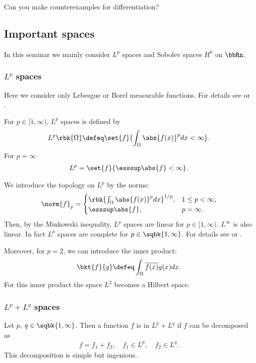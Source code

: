 \documentclass[openany, a4paper, oneside]{jsbook}
\begin{document}
Can you make counterexamples for differentiation?
\subsection{Important spaces}

In this seminar we mainly consider $L^p$ spaces and Sobolev spaces $H^k$ on $\bbRn$.
\subsubsection{$L^p$ spaces}

Here we consider only Lebesgue or Borel measurable functions.
For details see \cite{SeizoIto1} or \cite{LiebLoss1}.

For $p \in [1, \infty)$, $L^p$ spaces is defined by
\begin{align}
 L^p \rbk{\Omega}
 \defeq
 \set{f}{\int_{\Omega} \abs{f (x)}^p dx < \infty}.
\end{align}
For $p = \infty$
\begin{align}
 L^p
 =
 \set{f}{\esssup \abs{f} < \infty}.
\end{align}

We introduce the topology on $L^p$ by the norms:
\begin{align}
 \norm{f}_p
 =
 \begin{cases}
  \rbk{\int_{\Omega} \abs{f (x)}^p dx}^{1/p}, & 1 \leq p < \infty, \\
  \esssup \abs{f}, & p = \infty.
 \end{cases}
\end{align}
Then, by the Minkowski inequality, $L^p$ spaces are linear for $p \in [1, \infty)$.
$L^{\infty}$ is also linear.
In fact $L^p$ spaces are complete for $p \in \sqbk{1, \infty}$.
For details see \cite{SeizoIto1} or \cite{LiebLoss1}.

Moreover, for $p=2$, we can introduce the inner product:
\begin{align}
 \bkt{f}{g}
 \defeq
 \int_{\Omega} \overline{f (x)} g (x) dx.
\end{align}
For this inner product the space $L^2$ becomes a Hilbert space.
\subsubsection{$L^p+L^q$ spaces}

Let $p$, $q \in \sqbk{1, \infty}$.
Then a function $f$ is in $L^p + L^q$ if $f$ can be decomposed as
\begin{align}
 f = f_1 + f_2, \quad
 f_1 \in L^p, \quad f_2 \in L^q.
\end{align}
This decomposition is simple but ingenious.
\end{document}
